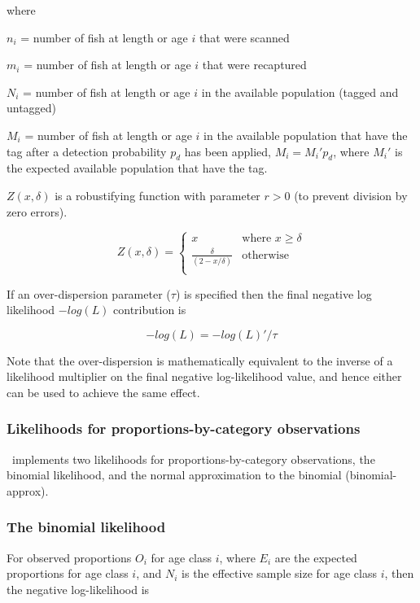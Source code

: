 where

$n_i$ = number of fish at length or age $i$ that were scanned

$m_i$ = number of fish at length or age $i$ that were recaptured

$N_i$ = number of fish at length or age $i$ in the available population (tagged and untagged)

$M_i$ = number of fish at length or age $i$ in the available population that have the tag after a detection probability $p_d$ has been applied, $M_i = M_i'p_d$, where $M_i'$ is the expected available population that have the tag.

$Z(x,\delta)$ is a robustifying function with parameter $r > 0$ (to prevent division by zero errors).

\[ Z(x,\delta) =
\begin{cases}
x       & \text{where } x \geq \delta\\
\frac{\delta}{(2 - x / \delta)}  & \text{otherwise}\\
\end{cases}
\]

If an over-dispersion parameter ($\tau$) is specified then the final negative log likelihood $-log(L)$ contribution is

$$-log(L) = -log(L)' / \tau$$

Note that the over-dispersion is mathematically equivalent to the inverse of a likelihood multiplier on the final negative log-likelihood value, and hence either can be used to achieve the same effect. 

\subsubsection{Likelihoods for proportions-by-category observations}

\CNAME\ implements two likelihoods for proportions-by-category observations, the binomial likelihood, and the normal approximation to the binomial (binomial-approx).

\subsubsection*{The binomial likelihood}

For observed proportions $O_i$ for age class $i$, where $E_i$ are the expected proportions for age class $i$, and $N_i$ is the effective sample size for age class $i$, then the negative log-likelihood is

